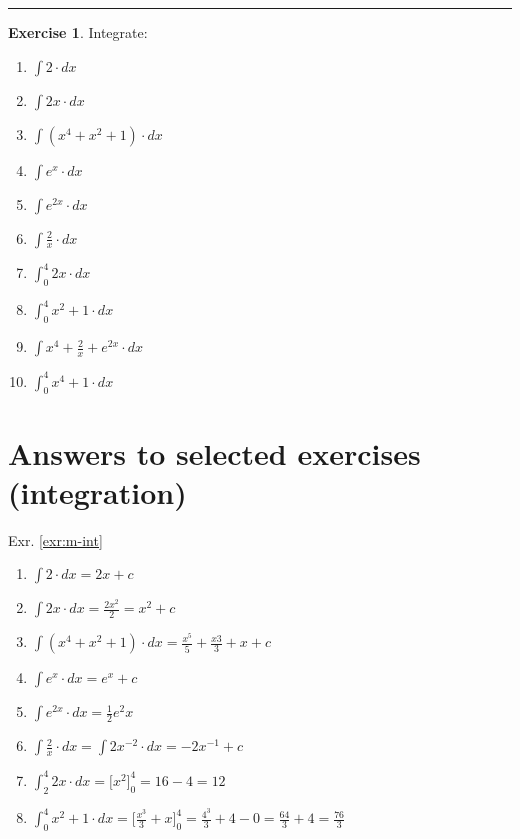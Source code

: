 \documentclass[
]{book}
\providecommand{\tightlist}{%
  \setlength{\itemsep}{0pt}\setlength{\parskip}{0pt}}
\theoremstyle{definition}
\theoremstyle{definition}
\theoremstyle{definition}
\newtheorem{exercise}{Exercise}[chapter]
\theoremstyle{remark}
\begin{document}
\begin{center}\rule{0.5\linewidth}{0.5pt}\end{center}

\begin{exercise}
\protect\hypertarget{exr:m-int}{}{\label{exr:m-int} }
Integrate:

\begin{enumerate}
\def\labelenumi{\alph{enumi})}
\tightlist
\item
  \(\int 2 \cdot dx\)
\item
  \(\int 2x\cdot dx\)
\item
  \(\int (x^4 + x^2 + 1)\cdot dx\)
\item
  \(\int e^x\cdot dx\)
\item
  \(\int e^{2x}\cdot dx\)
\item
  \(\int \frac{2}{x}\cdot dx\)
\item
  \(\int_0^4 2x\cdot dx\)
\item
  \(\int_0^4 x^2+1\cdot dx\)
\item
  \(\int x^4 + \frac{2}{x} + e^{2x}\cdot dx\)
\item
  \(\int_0^4 x^4+1\cdot dx\)
\end{enumerate}
\end{exercise}

\hypertarget{answers-to-selected-exercises-integration}{%
\section*{Answers to selected exercises (integration)}\label{answers-to-selected-exercises-integration}}

Exr. \ref{exr:m-int}

\begin{enumerate}
\def\labelenumi{\alph{enumi})}
\tightlist
\item
  \(\int 2 \cdot dx = 2x +c\)
\item
  \(\int 2x\cdot dx = \frac{2x^2}{2} = x^2 + c\)
\item
  \(\int (x^4 + x^2 + 1)\cdot dx = \frac{x^5}{5} + \frac{x3}{3} + x + c\)
\item
  \(\int e^x\cdot dx = e^x + c\)
\item
  \(\int e^{2x}\cdot dx = \frac{1}{2}e^2x\)
\item
  \(\int \frac{2}{x}\cdot dx =\int 2x^{-2} \cdot dx = -2 x^{-1} + c\)
\item
  \(\int_2^4 2x\cdot dx = \Bigr[x^2\Bigr]_0^4 = 16 - 4 = 12\)
\item
  \(\int_0^4 x^2+1\cdot dx = \Bigr[\frac{x^3}{3} + x \Bigr]_0^4=\frac{4^3}{3}+4 - 0 = \frac{64}{3}+4 = \frac{76}{3}\)
\end{enumerate}
\end{document}

